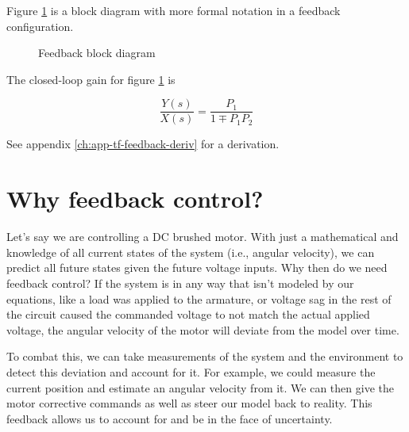 Figure \ref{fig:feedback_loop} is a block diagram with more formal notation in a
feedback configuration.

\begin{figure}[H]
  \centering


  \caption{Feedback block diagram}
  \label{fig:feedback_loop}
\end{figure}

The closed-loop gain for figure \ref{fig:feedback_loop} is

\begin{equation}
  \frac{Y(s)}{X(s)} = \frac{P_1}{1 \mp P_1 P_2}
\end{equation}

See appendix \ref{ch:app-tf-feedback-deriv} for a derivation.

\section{Why feedback control?}

Let's say we are controlling a DC brushed motor. With just a mathematical
 and knowledge of all current \glspl{state}
of the \gls{system} (i.e., angular velocity), we can predict all future
\glspl{state} given the future voltage \glspl{input}. Why then do we need
feedback control? If the system is  in any way
that isn't modeled by our equations, like a load was applied to the armature, or
voltage sag in the rest of the circuit caused the commanded voltage to not match
the actual applied voltage, the angular velocity of the motor will deviate from
the \gls{model} over time.

To combat this, we can take measurements of the system and the environment to
detect this deviation and account for it. For example, we could measure the
current position and estimate an angular velocity from it. We can then give the
motor corrective commands as well as steer our \gls{model} back to reality. This
feedback allows us to account for and be  in the
face of uncertainty.
